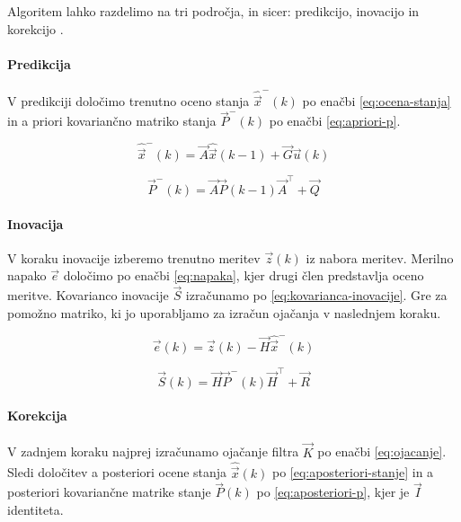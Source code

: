 Algoritem lahko razdelimo na tri področja, in sicer: predikcijo, inovacijo in korekcijo \cite{trucco1998introductory}.

\paragraph{Predikcija}
V predikciji določimo trenutno oceno stanja $\hat{\vec{x}}^-(k)$ po enačbi \eqref{eq:ocena-stanja} in a priori kovariančno matriko stanja $\vec{P}^-(k)$ po enačbi \eqref{eq:apriori-p}.

\begin{equation}
	\hat{\vec{x}}^-(k) = \vec{A} \hat{\vec{x}}(k-1) + \vec{G} \vec{u}(k)
    \label{eq:ocena-stanja}
\end{equation}

\begin{equation}
	\vec{P}^-(k) = \vec{A} \vec{P}(k-1) \vec{A}^\top + \vec{Q}
    \label{eq:apriori-p}
\end{equation}

\paragraph{Inovacija}
V koraku inovacije izberemo trenutno meritev $\vec{z}(k)$ iz nabora meritev. Merilno napako $\vec{e}$ določimo po enačbi \eqref{eq:napaka}, kjer drugi člen predstavlja oceno meritve. Kovarianco inovacije $\vec{S}$ izračunamo po \eqref{eq:kovarianca-inovacije}. Gre za pomožno matriko, ki jo uporabljamo za izračun ojačanja v naslednjem koraku.

\begin{equation}
	\vec{e}(k) = \vec{z}(k) - \vec{H} \hat{\vec{x}}^-(k)
    \label{eq:napaka}
\end{equation}

\begin{equation}
\vec{S}(k) = \vec{H} \vec{P}^-(k) \vec{H}^\top + \vec{R}
\label{eq:kovarianca-inovacije}
\end{equation}

\paragraph{Korekcija}
V zadnjem koraku najprej izračunamo ojačanje filtra $\vec{K}$ po enačbi \eqref{eq:ojacanje}. Sledi določitev a posteriori ocene stanja $\hat{\vec{x}}(k)$ po \eqref{eq:aposteriori-stanje} in a posteriori kovariančne matrike stanje $\vec{P}(k)$ po \eqref{eq:aposteriori-p}, kjer je $\vec{I}$ identiteta.

